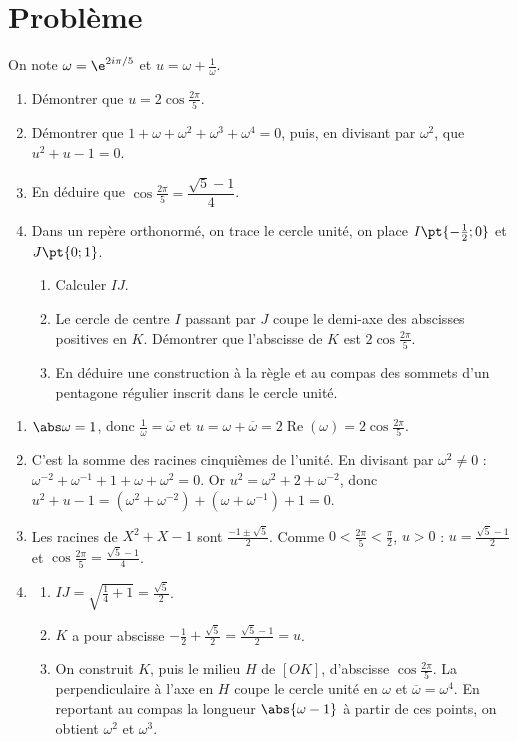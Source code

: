 \mxnewpage
\section{Problème}
\begin{problem}
On note $\omega=\e^{2i\pi/5}$ et $u=\omega+\frac1\omega$.
\begin{enumerate}
\item Démontrer que $u=2\cos\frac{2\pi}5$.
\item Démontrer que $1+\omega+\omega^2+\omega^3+\omega^4=0$, puis, en divisant par $\omega^2$, que $u^2+u-1=0$.
\item En déduire que $\cos\frac{2\pi}5=\dfrac{\sqrt5-1}4$.
\item Dans un repère orthonormé, on trace le cercle unité, on place $I\pt{-\frac12;0}$ et $J\pt{0;1}$.
\begin{enumerate}
\item Calculer $IJ$.
\item Le cercle de centre $I$ passant par $J$ coupe le demi-axe des abscisses positives en $K$. Démontrer que l'abscisse de $K$ est $2\cos\frac{2\pi}5$.
\item En déduire une construction à la règle et au compas des sommets d'un pentagone régulier inscrit dans le cercle unité.
\end{enumerate}
\end{enumerate}
\end{problem}
\begin{solution}[Problème]
\begin{enumerate}
\item $\abs\omega=1$, donc $\frac1\omega=\overline\omega$ et $u=\omega+\overline\omega=2\operatorname{Re}(\omega)=2\cos\frac{2\pi}5$.
\item C'est la somme des racines cinquièmes de l'unité. En divisant par $\omega^2\neq0$ : $\omega^{-2}+\omega^{-1}+1+\omega+\omega^2=0$. Or $u^2=\omega^2+2+\omega^{-2}$, donc $u^2+u-1=\left(\omega^2+\omega^{-2}\right)+\left(\omega+\omega^{-1}\right)+1=0$.
\item Les racines de $X^2+X-1$ sont $\frac{-1\pm\sqrt5}2$. Comme $0<\frac{2\pi}5<\frac\pi2$, $u>0$ : $u=\frac{\sqrt5-1}2$ et $\cos\frac{2\pi}5=\frac{\sqrt5-1}4$.
\item
\begin{enumerate}
\item $IJ=\sqrt{\frac14+1}=\frac{\sqrt5}2$.
\item $K$ a pour abscisse $-\frac12+\frac{\sqrt5}2=\frac{\sqrt5-1}2=u$.
\item On construit $K$, puis le milieu $H$ de $[OK]$, d'abscisse $\cos\frac{2\pi}5$. La perpendiculaire à l'axe en $H$ coupe le cercle unité en $\omega$ et $\overline\omega=\omega^4$. En reportant au compas la longueur $\abs{\omega-1}$ à partir de ces points, on obtient $\omega^2$ et $\omega^3$.
\end{enumerate}
\end{enumerate}
\end{solution}
